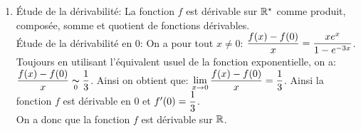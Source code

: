 \documentclass[a4paper, 11pt,reqno]{article}
\begin{document}
\begin{correction}
\begin{enumerate}
\begin{itemize}
			      \item[$\bullet$] Prolongement par continuit\'e en $0$ : on a montr\'e que  $\lim\limits_{x\to 0} f(x)=0$, donc la fonction $f$ est prolongeable par continuit\'e en 0 en posant $f(0)=0$. Et en notant toujours $f$ la nouvelle fonction ainsi obtenue, on a pour tout $x\in\R$: $f(x)=\left\lbrace \begin{array}{ll}
					            \ddp\frac{x^2e^x}{1-e^{-3x}} & \hbox{si}\ x\not= 0\vsec \\
					            0                            & \hbox{si}\ x=0.
				            \end{array}\right.$
		      \end{itemize}
		\item \'Etude de la d\'erivabilit\'e: La fonction $f$ est d\'erivable sur $\mathbb{R}^{\star}$ comme produit, compos\'ee, somme et quotient de fonctions d\'erivables.\\
		      \noindent \'Etude de la d\'erivabilit\'e en 0: On a pour tout $x\not= 0$: $\displaystyle\frac{f(x)-f(0)}{x}=\displaystyle\frac{xe^x}{1-e^{-3x}}$. Toujours en utilisant l'\'equivalent usuel de la fonction exponentielle, on a: $\displaystyle\frac{f(x)-f(0)}{x}\underset{0}{\thicksim} \displaystyle\frac{1}{3}$. Ainsi on obtient que: $\lim\limits_{x\to 0} \displaystyle\frac{f(x)-f(0)}{x}=\displaystyle\frac{1}{3}$. Ainsi la fonction $f$ est d\'erivable en 0 et $f^{\prime}(0)=\displaystyle\frac{1}{3}$.\\
		      \noindent On a donc que la fonction $f$ est d\'erivable sur $\mathbb{R}$.
	\end{enumerate}
\end{correction}
\end{document}
